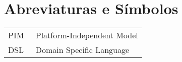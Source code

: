\chapter*{Abreviaturas e Símbolos}

\begin{flushleft}
\begin{tabular}{l p{0.8\linewidth}}
PIM       & Platform-Independent Model\\
DSL       & Domain Specific Language\\
\end{tabular}
\end{flushleft}

